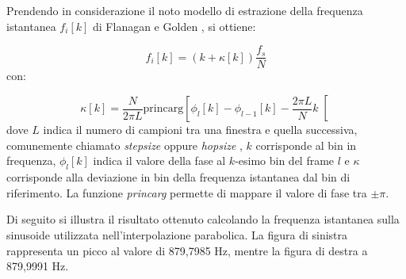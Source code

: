 \documentclass[12pt]{report}
\begin{document}
Prendendo in considerazione il noto modello di estrazione della frequenza istantanea $f_i[k]$ di Flanagan e Golden \cite{phase1}, si ottiene:

$$ f_i[k] = (k + \kappa[k])\frac{f_s}{N} $$
con:

$$ \kappa[k] = \frac{N}{2\pi L}\mbox{princarg}\left[\phi_l[k] - \phi_{l-1}[k] -
	\frac{2\pi L}{N}k \right[ $$
dove $L$ indica il numero di campioni tra una finestra e quella successiva, comunemente chiamato {\itshape stepsize} oppure {\itshape hopsize} , $k$ corrisponde al bin in frequenza, $\phi_l[k]$ indica il valore della fase al $k$-esimo bin del frame $l$ e $\kappa$ corrisponde alla deviazione in bin della frequenza istantanea dal bin di riferimento. La funzione {\itshape princarg} permette di mappare il valore di fase tra $\pm \pi$.

Di seguito si illustra il risultato ottenuto calcolando la frequenza istantanea sulla sinusoide utilizzata nell'interpolazione parabolica. La figura di sinistra rappresenta un picco al valore di 879,7985 Hz, mentre la figura di destra a 879,9991 Hz.
\end{document}

